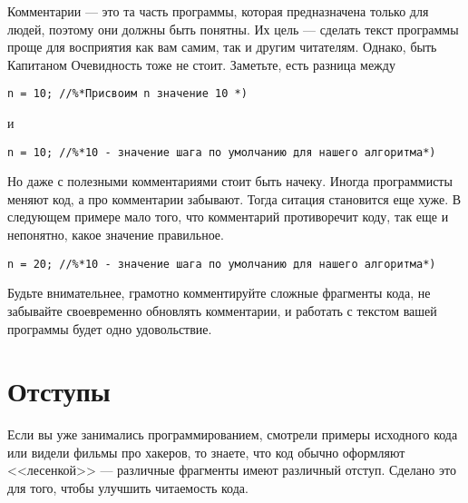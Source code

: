 \documentclass{article}
\begin{document}
Комментарии --- это та часть программы, которая предназначена только для людей, поэтому они должны быть понятны. Их цель --- сделать текст программы проще для восприятия как вам самим, так и другим читателям. Однако, быть Капитаном Очевидность тоже не стоит. Заметьте, есть разница между

%

\begin{lstlisting}[caption={Абсолютно бессмысленный комментарий}, captionpos=b, style=cpp]
	n = 10; //%*Присвоим n значение 10 *)
\end{lstlisting}

и

\begin{lstlisting}[caption={Feel the difference}, captionpos=b, style=cpp]
	n = 10; //%*10 - значение шага по умолчанию для нашего алгоритма*)
\end{lstlisting}

Но даже с полезными комментариями стоит быть начеку. Иногда программисты меняют код, а про комментарии забывают. Тогда ситация становится еще хуже. В следующем примере мало того, что комментарий противоречит коду, так еще и непонятно, какое значение правильное.

\begin{lstlisting}[caption={Oops}, captionpos=b, style=cpp]
	n = 20; //%*10 - значение шага по умолчанию для нашего алгоритма*)
\end{lstlisting}

Будьте внимательнее, грамотно комментируйте сложные фрагменты кода, не забывайте своевременно обновлять комментарии, и работать с текстом вашей программы будет одно удовольствие.

\section*{Отступы}

Если вы уже занимались программированием, смотрели примеры исходного кода или видели фильмы про хакеров, то знаете, что код обычно оформляют <<лесенкой>> --- различные фрагменты имеют различный отступ. Сделано это для того, чтобы улучшить читаемость кода.

\end{document}
